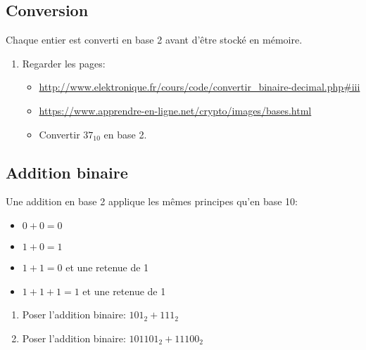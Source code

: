 \documentclass[a4paper,11pt]{article}
\begin{document}
\begin{Form}
\subsection{Conversion}
Chaque entier est converti en base 2 avant d'être stocké en mémoire.
\begin{activite}
\begin{enumerate}
\item Regarder les pages:
\begin{itemize}
\item \url{http://www.elektronique.fr/cours/code/convertir_binaire-decimal.php#iii}
\item \url{https://www.apprendre-en-ligne.net/crypto/images/bases.html}
\item Convertir $37_{10}$ en base 2.
\end{itemize}
\end{enumerate}
\end{activite}
\subsection{Addition binaire}
Une addition en base 2 applique les mêmes principes qu'en base 10:
\begin{itemize}
\item $0 + 0 = 0$
\item $1 + 0 = 1$
\item $1 + 1 = 0$ et une retenue de 1
\item $1 + 1 + 1 = 1$ et une retenue de 1
\end{itemize}
\begin{activite}
\begin{enumerate}
\item Poser l'addition binaire: $101_2 + 111_2$
\item Poser l'addition binaire: $101101_2 + 11100_2$
\end{enumerate}
\end{activite}

\end{Form}
\end{document}
